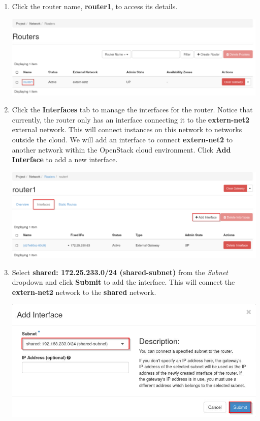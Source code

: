 \documentclass[letterpaper, 12pt]{article}
\begin{document}
\begin{enumerate}
    \item Click the router name, \textbf{router1}, to access its details.
    
    \begin{center}
        \includegraphics[width=\linewidth]{images/part2/step4.png}
    \end{center}

    \item Click the \textbf{Interfaces} tab to manage the interfaces for the router. Notice that currently, the router
    only has an interface connecting it to the \textbf{extern-net2} external network. This will connect instances on
    this network to networks outside the cloud. We will add an interface to connect \textbf{extern-net2} to another
    network within the OpenStack cloud environment. Click \textbf{Add Interface} to add a new interface.

    \begin{center}
        \includegraphics[width=\linewidth]{images/part2/step5.png}
    \end{center}

    \item Select \textbf{shared: 172.25.233.0/24 (shared-subnet)} from the \textit{Subnet} dropdown and click
    \textbf{Submit} to add the interface. This will connect the \textbf{extern-net2} network to the \textbf{shared}
    network.

    \begin{center}
        \includegraphics[width=\linewidth]{images/part2/step6.png}
    \end{center}


\end{enumerate}
\end{document}

